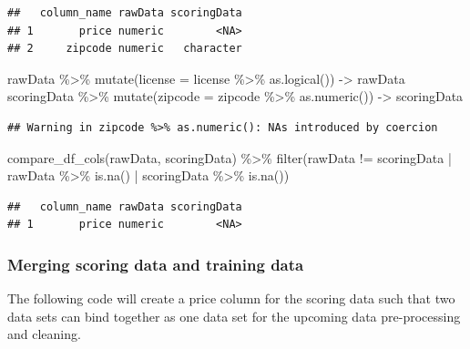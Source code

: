 \documentclass[
]{article}
\newenvironment{Shaded}{\begin{snugshade}}{\end{snugshade}}
\newcommand{\AttributeTok}[1]{\textcolor[rgb]{0.77,0.63,0.00}{#1}}
\newcommand{\FunctionTok}[1]{\textcolor[rgb]{0.00,0.00,0.00}{#1}}
\newcommand{\NormalTok}[1]{#1}
\newcommand{\OtherTok}[1]{\textcolor[rgb]{0.56,0.35,0.01}{#1}}
\newcommand{\SpecialCharTok}[1]{\textcolor[rgb]{0.00,0.00,0.00}{#1}}
\begin{document}
\begin{verbatim}
##   column_name rawData scoringData
## 1       price numeric        <NA>
## 2     zipcode numeric   character
\end{verbatim}

\begin{Shaded}
\begin{Highlighting}[]
\NormalTok{rawData }\SpecialCharTok{\%\textgreater{}\%} \FunctionTok{mutate}\NormalTok{(}\AttributeTok{license =}\NormalTok{ license }\SpecialCharTok{\%\textgreater{}\%} \FunctionTok{as.logical}\NormalTok{()) }\OtherTok{{-}\textgreater{}}\NormalTok{ rawData}
\NormalTok{scoringData  }\SpecialCharTok{\%\textgreater{}\%} \FunctionTok{mutate}\NormalTok{(}\AttributeTok{zipcode =}\NormalTok{ zipcode }\SpecialCharTok{\%\textgreater{}\%} \FunctionTok{as.numeric}\NormalTok{()) }\OtherTok{{-}\textgreater{}}\NormalTok{ scoringData}
\end{Highlighting}
\end{Shaded}

\begin{verbatim}
## Warning in zipcode %>% as.numeric(): NAs introduced by coercion
\end{verbatim}

\begin{Shaded}
\begin{Highlighting}[]
\FunctionTok{compare\_df\_cols}\NormalTok{(rawData, scoringData) }\SpecialCharTok{\%\textgreater{}\%}
  \FunctionTok{filter}\NormalTok{(rawData }\SpecialCharTok{!=}\NormalTok{ scoringData }\SpecialCharTok{|}\NormalTok{ rawData }\SpecialCharTok{\%\textgreater{}\%} \FunctionTok{is.na}\NormalTok{() }\SpecialCharTok{|}\NormalTok{ scoringData }\SpecialCharTok{\%\textgreater{}\%} \FunctionTok{is.na}\NormalTok{())}
\end{Highlighting}
\end{Shaded}

\begin{verbatim}
##   column_name rawData scoringData
## 1       price numeric        <NA>
\end{verbatim}

\hypertarget{merging-scoring-data-and-training-data}{%
\subsubsection{Merging scoring data and training
data}\label{merging-scoring-data-and-training-data}}

The following code will create a price column for the scoring data such
that two data sets can bind together as one data set for the upcoming
data pre-processing and cleaning.
\end{document}
